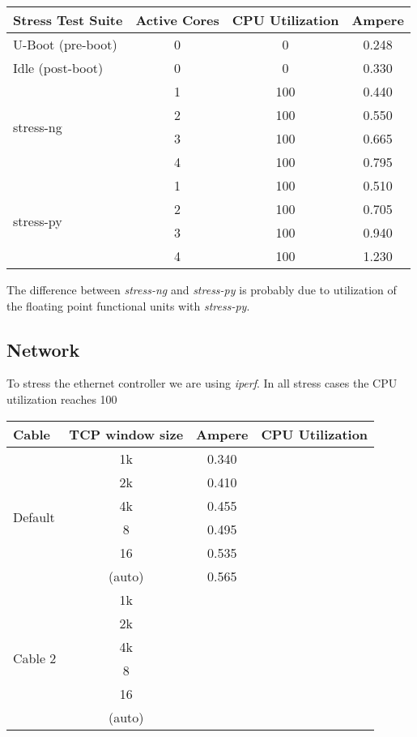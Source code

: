 \begin{tabular}{| l | c | c | c |}
\hline
 Stress Test Suite & Active Cores & CPU Utilization & Ampere \\
\hline
\hline
 U-Boot (pre-boot) & 0 & 0 & 0.248 \\
\hline
 Idle (post-boot)  & 0 & 0 & 0.330\\
\hline
 \multirow{4}{*}{stress-ng} & 1 & 100 & 0.440\\
  & 2 & 100 & 0.550  \\
  & 3 & 100 & 0.665  \\
  & 4 & 100 & 0.795  \\
\hline
 \multirow{4}{*}{stress-py} & 1 & 100 & 0.510\\
  & 2 & 100 & 0.705  \\
  & 3 & 100 & 0.940  \\
  & 4 & 100 & 1.230  \\
\hline
\end{tabular}

The difference between \textit{stress-ng}\cite{stress-ng} and \textit{stress-py}\cite{stress-py} is probably due to utilization of the floating point functional units with \textit{stress-py}.

\subsection{Network}

To stress the ethernet controller we are using \textit{iperf}\cite{iperf}. In all stress cases the CPU utilization reaches 100%


\begin{tabular}{| l | c | c | c |}
\hline
 Cable & TCP window size & Ampere & CPU Utilization \\
\hline
\hline
 \multirow{6}{*}{Default} & 1k & 0.340 & \\
  & 2k & 0.410 & \\
  & 4k & 0.455 & \\
  & 8 & 0.495 & \\
  & 16 & 0.535 & \\
  & (auto) & 0.565 & \\
\hline
 \multirow{6}{*}{Cable 2} & 1k & & \\
  & 2k & & \\
  & 4k & & \\
  & 8 & & \\
  & 16 & & \\
  & (auto) & & \\
\hline
\end{tabular}


